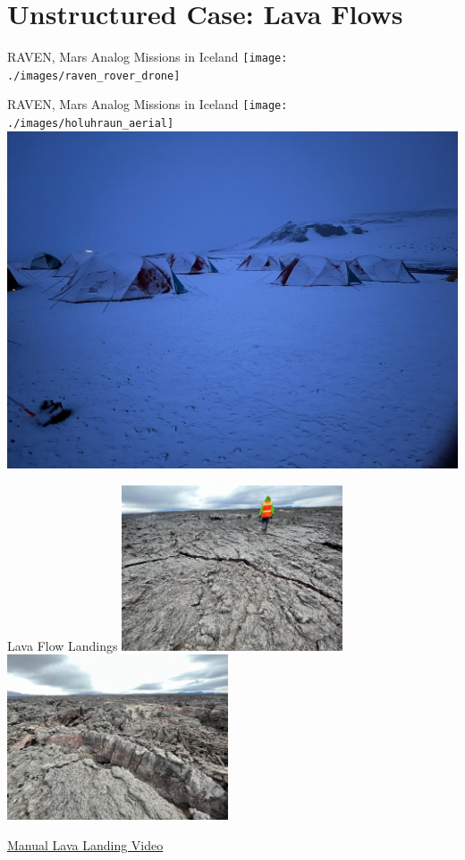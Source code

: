 \documentclass[aspectratio=169]{beamer}
\begin{document}
\section{Unstructured Case: Lava Flows}

\begin{frame}{RAVEN, Mars Analog Missions in Iceland}
	\centering
	\texttt{[image: ./images/raven\_rover\_drone]}
\end{frame}

\begin{frame}{RAVEN, Mars Analog Missions in Iceland}
	\centering
	\texttt{[image: ./images/holuhraun\_aerial]}
	\includegraphics[height=0.55\textheight]{./images/dreki_small_tents_snow}
\end{frame}

\begin{frame}{Lava Flow Landings}
	\centering
	\includegraphics[width=0.49\textwidth]{./images/holuhraun_smooth}
	\includegraphics[width=0.49\textwidth]{./images/holuhraun_rough}

	\href{run:./lava_landing.mp4}{Manual Lava Landing Video}
\end{frame}
\end{document}

